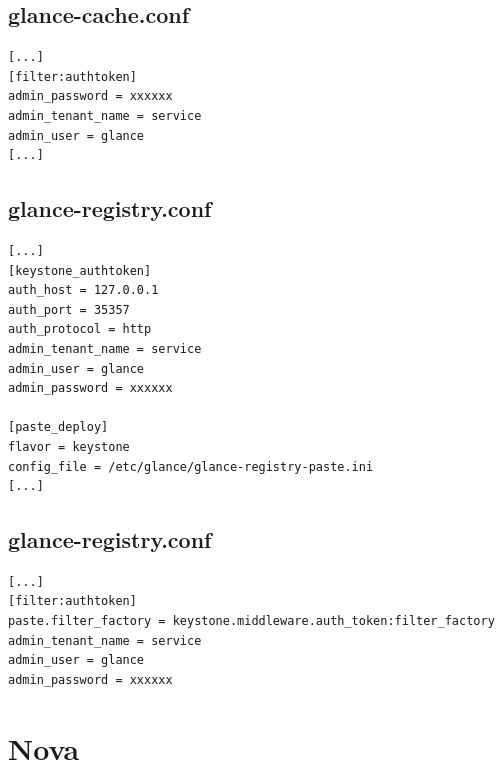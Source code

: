 \documentclass[a4paper,oneside]{report}
\begin{document}
\subsection{glance-cache.conf}
\begin{verbatim}
[...]
[filter:authtoken]
admin_password = xxxxxx
admin_tenant_name = service
admin_user = glance
[...]
\end{verbatim}

\subsection{glance-registry.conf}
\begin{verbatim}
[...]
[keystone_authtoken]
auth_host = 127.0.0.1
auth_port = 35357
auth_protocol = http
admin_tenant_name = service
admin_user = glance
admin_password = xxxxxx

[paste_deploy]
flavor = keystone
config_file = /etc/glance/glance-registry-paste.ini
[...]
\end{verbatim}

\subsection{glance-registry.conf}
\begin{verbatim}
[...]
[filter:authtoken]
paste.filter_factory = keystone.middleware.auth_token:filter_factory
admin_tenant_name = service
admin_user = glance
admin_password = xxxxxx
\end{verbatim}

\newpage
\section{Nova} \label{conf:Nova}
\end{document}
